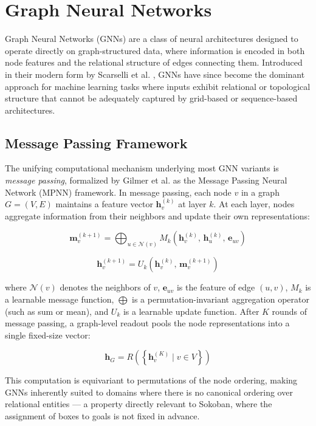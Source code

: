 \section{Graph Neural Networks}

Graph Neural Networks (GNNs) are a class of neural architectures designed to operate directly on graph-structured data, where information is encoded in both node features and the relational structure of edges connecting them. Introduced in their modern form by Scarselli et al. \cite{scarselli2009graph}, GNNs have since become the dominant approach for machine learning tasks where inputs exhibit relational or topological structure that cannot be adequately captured by grid-based or sequence-based architectures.

\subsection{Message Passing Framework}

The unifying computational mechanism underlying most GNN variants is \textit{message passing}, formalized by Gilmer et al. \cite{gilmer2017neural} as the Message Passing Neural Network (MPNN) framework. In message passing, each node $v$ in a graph $G = (V, E)$ maintains a feature vector $\mathbf{h}_v^{(k)}$ at layer $k$. At each layer, nodes aggregate information from their neighbors and update their own representations:

$$\mathbf{m}_v^{(k+1)} = \bigoplus_{u \in \mathcal{N}(v)} M_k\!\left(\mathbf{h}_v^{(k)},\, \mathbf{h}_u^{(k)},\, \mathbf{e}_{uv}\right)$$

$$\mathbf{h}_v^{(k+1)} = U_k\!\left(\mathbf{h}_v^{(k)},\, \mathbf{m}_v^{(k+1)}\right)$$

where $\mathcal{N}(v)$ denotes the neighbors of $v$, $\mathbf{e}_{uv}$ is the feature of edge $(u, v)$, $M_k$ is a learnable message function, $\bigoplus$ is a permutation-invariant aggregation operator (such as sum or mean), and $U_k$ is a learnable update function. After $K$ rounds of message passing, a graph-level readout pools the node representations into a single fixed-size vector:

$$\mathbf{h}_G = R\!\left(\left\{\mathbf{h}_v^{(K)} \mid v \in V\right\}\right)$$

This computation is equivariant to permutations of the node ordering, making GNNs inherently suited to domains where there is no canonical ordering over relational entities --- a property directly relevant to Sokoban, where the assignment of boxes to goals is not fixed in advance.

